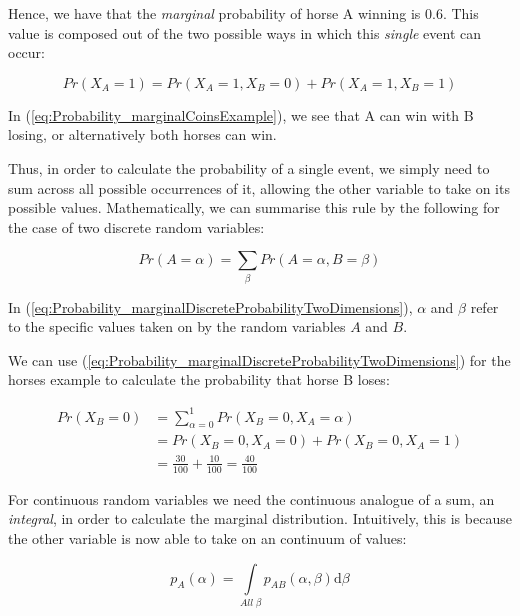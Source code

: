 \documentclass[11pt,fullpage]{book}
\begin{document}
Hence, we have that the \textit{marginal} probability of horse A winning is 0.6. This value is composed out of the two possible ways in which this \textit{single} event can occur:

\begin{equation}\label{eq:Probability_marginalCoinsExample}
Pr(X_A=1) = Pr(X_A=1,X_B=0) + Pr(X_A=1,X_B=1)
\end{equation}

In (\ref{eq:Probability_marginalCoinsExample}), we see that A can win with B losing, or alternatively both horses can win.

Thus, in order to calculate the probability of a single event, we simply need to sum across all possible occurrences of it, allowing the other variable to take on its possible values. Mathematically, we can summarise this rule by the following for the case of two discrete random variables:

\begin{equation}\label{eq:Probability_marginalDiscreteProbabilityTwoDimensions}
Pr(A=\alpha) = \sum\limits_{\beta} Pr(A=\alpha,B=\beta)
\end{equation}

In (\ref{eq:Probability_marginalDiscreteProbabilityTwoDimensions}), $\alpha$ and $\beta$ refer to the specific values taken on by the random variables $A$ and $B$. 

We can use (\ref{eq:Probability_marginalDiscreteProbabilityTwoDimensions}) for the horses example to calculate the probability that horse B loses:

\begin{equation}
\begin{align}
Pr(X_B=0) &= \sum\limits_{\alpha=0}^{1} Pr(X_B=0,X_A=\alpha)\\
&= Pr(X_B=0,X_A=0) + Pr(X_B=0,X_A=1)\\
&= \frac{30}{100}  + \frac{10}{100}  = \frac{40}{100} 
\end{align}
\end{equation}

For continuous random variables we need the continuous analogue of a sum, an \textit{integral}, in order to calculate the marginal distribution. Intuitively, this is because the other variable is now able to take on an continuum of values:

\begin{equation}\label{eq:Probability_marginalContinuousProbabilityTwoDimensions}
p_A(\alpha) = \int\limits_{All\;\beta} p_{AB}(\alpha,\beta) \mathrm{d}\beta
\end{equation}
\end{document}
